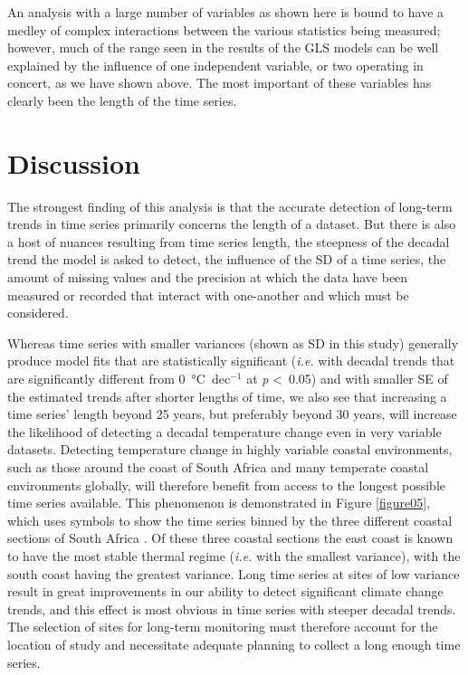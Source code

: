 \documentclass[twocol]{ametsoc}
\begin{document}
An analysis with a large number of variables as shown here is bound to have a medley of complex interactions between the various statistics being measured; however, much of the range seen in the results of the GLS models can be well explained by the influence of one independent variable, or two operating in concert, as we have shown above. The most important of these variables has clearly been the length of the time series.

\section{Discussion}
The strongest finding of this analysis is that the accurate detection of long-term trends in time series primarily concerns the length of a dataset. But there is also a host of nuances resulting from time series length, the steepness of the decadal trend the model is asked to detect, the influence of the SD of a time series, the amount of missing values and the precision at which the data have been measured or recorded that interact with one-another and which must be considered.

Whereas time series with smaller variances (shown as SD in this study) generally produce model fits that are statistically significant (\emph{i.e.} with decadal trends that are significantly different from \SI{0}{\degreeCelsius}~dec$^{-1}$ at \emph{p} \textless~0.05) and with smaller SE of the estimated trends after shorter lengths of time, we also see that increasing a time series' length beyond 25 years, but preferably beyond 30 years, will increase the likelihood of detecting a decadal temperature change even in very variable datasets. Detecting temperature change in highly variable coastal environments, such as those around the coast of South Africa and many temperate coastal environments globally, will therefore benefit from access to the longest possible time series available. This phenomenon is demonstrated in Figure \ref{figure05}, which uses symbols to show the time series binned by the three different coastal sections of South Africa \citep{Smit2013}. Of these three coastal sections the east coast is known to have the most stable thermal regime (\emph{i.e.} with the smallest variance), with the south coast having the greatest variance. Long time series at sites of low variance result in great improvements in our ability to detect significant climate change trends, and this effect is most obvious in time series with steeper decadal trends. The selection of sites for long-term monitoring must therefore account for the location of study and necessitate adequate planning to collect a long enough time series.
\end{document}
